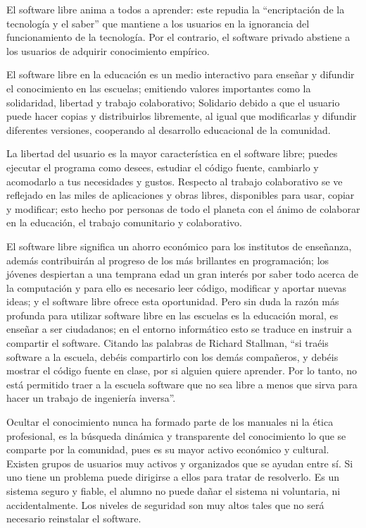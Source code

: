 El software libre anima a todos a aprender: este repudia la
“encriptación de la tecnología y el saber” que mantiene a los
usuarios en la ignorancia del funcionamiento de la tecnología.
Por el contrario, el software privado abstiene a los usuarios de
adquirir conocimiento empírico.

El software libre en la educación es un medio interactivo para
enseñar y difundir el conocimiento en las escuelas; emitiendo
valores importantes como la solidaridad, libertad y trabajo
colaborativo; Solidario debido a que el usuario puede hacer
copias y distribuirlos libremente, al igual que modificarlas y
difundir diferentes versiones, cooperando al desarrollo
educacional de la comunidad.

La libertad del usuario es la mayor característica en el software
libre; puedes ejecutar el programa como desees, estudiar el
código fuente, cambiarlo y acomodarlo a tus necesidades y
gustos. Respecto al trabajo colaborativo se ve reflejado en las
miles de aplicaciones y obras libres, disponibles para usar,
copiar y modificar; esto hecho por personas de todo el planeta
con el ánimo de colaborar en la educación, el trabajo
comunitario y colaborativo.

El software libre significa un ahorro económico para los
institutos de enseñanza, además contribuirán al progreso de los
más brillantes en programación; los jóvenes despiertan a una
temprana edad un gran interés por saber todo acerca de la
computación y para ello es necesario leer código, modificar y
aportar nuevas ideas; y el software libre ofrece esta
oportunidad.
Pero sin duda la razón más profunda para utilizar software libre
en las escuelas es la educación moral, es enseñar a ser
ciudadanos; en el entorno informático esto se traduce en
instruir a compartir el software. 
Citando las palabras de Richard Stallman, “si traéis software a la escuela, debéis
compartirlo con los demás compañeros, y debéis mostrar el
código fuente en clase, por si alguien quiere aprender. Por lo
tanto, no está permitido traer a la escuela software que no sea
libre a menos que sirva para hacer un trabajo de ingeniería
inversa”.

Ocultar el conocimiento nunca ha formado parte de los
manuales ni la ética profesional, es la búsqueda dinámica y
transparente del conocimiento lo que se comparte por la
comunidad, pues es su mayor activo económico y cultural.
Existen grupos de usuarios muy activos y organizados que se
ayudan entre sí. Si uno tiene un problema puede dirigirse a ellos
para tratar de resolverlo.
Es un sistema seguro y fiable, el alumno no puede dañar el
sistema ni voluntaria, ni accidentalmente. Los niveles de
seguridad son muy altos tales que no será necesario reinstalar el
software.

